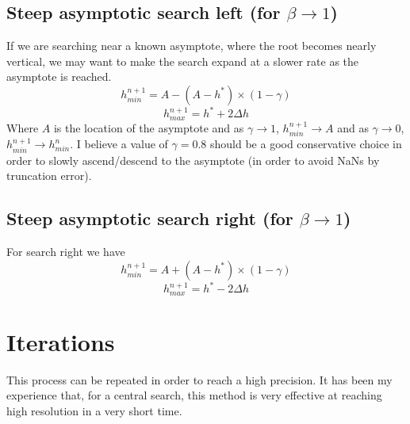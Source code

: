 \documentclass[11pt]{article}
\begin{document}
\subsection{Steep asymptotic search left (for \texorpdfstring{$\beta \rightarrow 1$}{beta approaching 1})}
If we are searching near a known asymptote, where the root becomes nearly vertical, we may want to make the search expand at a slower rate as the asymptote is reached.
\begin{equation}
	h_{min}^{n+1}=A-(A-h^*)\times(1-\gamma)
\end{equation}
\begin{equation}
	h_{max}^{n+1} = h^*+2\Delta h
\end{equation}
Where $A$ is the location of the asymptote and as $\gamma \rightarrow 1$, $h_{min}^{n+1} \rightarrow A$ and as $\gamma \rightarrow 0$, $h_{min}^{n+1} \rightarrow h_{min}^{n}$. I believe a value of $\gamma = 0.8$ should be a good conservative choice in order to slowly ascend/descend to the asymptote (in order to avoid NaNs by truncation error).

\subsection{Steep asymptotic search right (for \texorpdfstring{$\beta \rightarrow 1$}{beta approaching 1})}
For search right we have
\begin{equation}
	h_{min}^{n+1}=A+(A-h^*)\times(1-\gamma)
\end{equation}
\begin{equation}
	h_{max}^{n+1} = h^*-2\Delta h
\end{equation}

\section{Iterations}
This process can be repeated in order to reach a high precision. It has been my experience that, for a central search, this method is very effective at reaching high resolution in a very short time.
\end{document}
